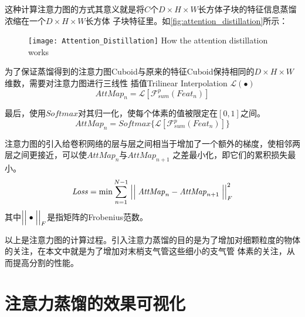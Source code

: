 这种计算注意力图的方式其意义就是将$C$个$D \times H \times W$长方体子块的特征信息蒸馏浓缩在一个$D \times H \times W$长方体
子块特征里。如\autoref{fig:attention_distillation}所示：
\begin{figure}[!htp]
    \centering
    \texttt{[image: Attention\_Distillation]}
        {How the attention distillation works}
    \label{fig:attention_distillation}
\end{figure}

为了保证蒸馏得到的注意力图Cuboid与原来的特征Cuboid保持相同的$D \times H \times W$维数，需要对注意力图进行三线性
插值Trilinear Interpolation $\mathcal{L}(\bullet)$
\begin{equation}
    \mathit{AttMap}_{n} = \mathcal{L}\left[\mathcal{F}_{sum}^{p}\left(\mathit{Feat}_{n}\right)\right]
\end{equation}

最后，使用$Softmax$对其归一化，使每个体素的值被限定在$[0, 1]$之间。
\begin{equation}
    \mathit{AttMap}_{n} = \mathit{Softmax}\{ \mathcal{L}\left[\mathcal{F}_{sum}^{p}\left(\mathit{Feat}_{n}\right)\right] \}
\end{equation}

注意力图的引入给卷积网络的层与层之间相当于增加了一个额外的梯度，使相邻两层之间更接近，可以使$\mathit{AttMap}_{n}$与$\mathit{AttMap}_{n+1}$
之差最小化，即它们的累积损失最小。
\begin{equation}\label{eq:attention_distillation_loss}
    \mathit{Loss} = \min \sum_{n=1}^{N-1} \Bigm|\Bigm|\mathit{AttMap}_{n} - \mathit{AttMap}_{n+1} \Bigm|\Bigm|_{F}^{2}
\end{equation}
其中$\Bigm|\Bigm|\bullet\Bigm|\Bigm|_{F}$是指矩阵的Frobenius范数。

以上是注意力图的计算过程。引入注意力蒸馏的目的是为了增加对细颗粒度的物体的关注，在本文中就是为了增加对末梢支气管这些细小的支气管
体素的关注，从而提高分割的性能。

\section{注意力蒸馏的效果可视化}

